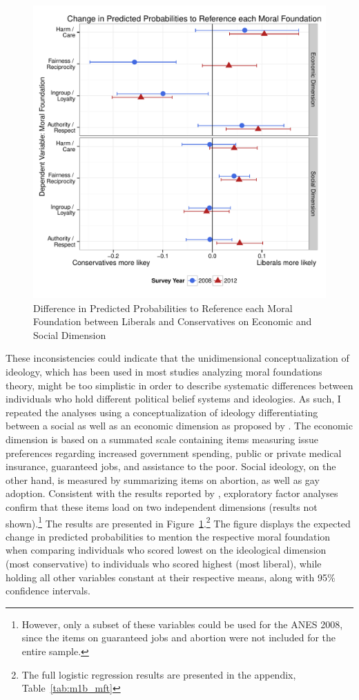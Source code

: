 \documentclass[12pt]{article}
\begin{document}
\begin{figure}\centering
\includegraphics[scale=.6]{../calc/fig/m1b_mft.pdf}
\caption{Difference in Predicted Probabilities to Reference each Moral Foundation between Liberals and Conservatives on Economic and Social Dimension}\label{fig:m1b_mft}
\end{figure}

These inconsistencies could indicate that the unidimensional conceptualization of ideology, which has been used in most studies analyzing moral foundations theory, might be too simplistic in order to describe systematic differences between individuals who hold different political belief systems and ideologies. As such, I repeated the analyses using a conceptualization of ideology differentiating between a social as well as an economic dimension as proposed by \citet{feldman2013understanding}. The economic dimension is based on a summated scale containing items measuring issue preferences regarding increased government spending, public or private medical insurance, guaranteed jobs, and assistance to the poor. Social ideology, on the other hand, is measured by summarizing items on abortion, as well as gay adoption. Consistent with the results reported by \citet{feldman2013understanding}, exploratory factor analyses confirm that these items load on two independent dimensions (results not shown).\footnote{However, only a subset of these variables could be used for the ANES 2008, since the items on guaranteed jobs and abortion were not included for the entire sample.} The results are presented in Figure~\ref{fig:m1b_mft}.\footnote{The full logistic regression results are presented in the appendix, Table~\ref{tab:m1b_mft}} The figure displays the expected change in predicted probabilities to mention the respective moral foundation when comparing individuals who scored lowest on the ideological dimension (most conservative) to individuals who scored highest (most liberal), while holding all other variables constant at their respective means, along with 95\% confidence intervals.
\end{document}
